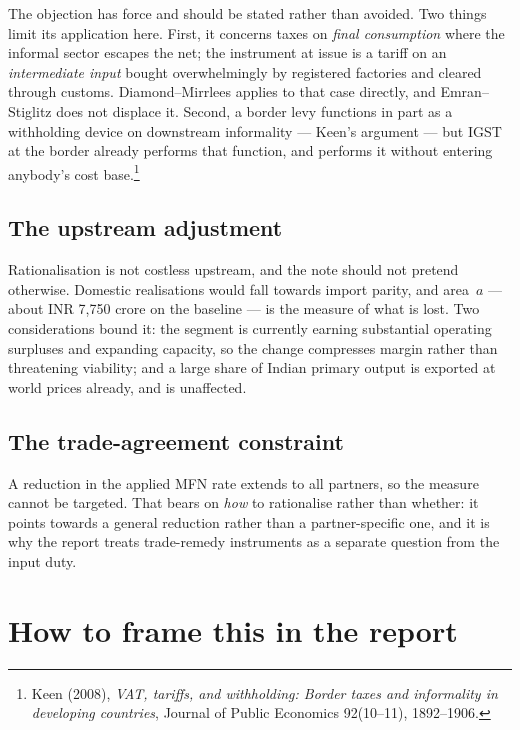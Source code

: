 \documentclass[11pt, a4paper]{article}
\begin{document}
The objection has force and should be stated rather than avoided. Two things limit
its application here. First, it concerns taxes on \emph{final consumption} where the
informal sector escapes the net; the instrument at issue is a tariff on an
\emph{intermediate input} bought overwhelmingly by registered factories and cleared
through customs. Diamond--Mirrlees applies to that case directly, and
Emran--Stiglitz does not displace it. Second, a border levy functions in part as a
withholding device on downstream informality --- Keen's argument --- but IGST at the
border already performs that function, and performs it without entering anybody's
cost base.\footnote{Keen (2008), \textit{VAT, tariffs, and withholding: Border taxes
and informality in developing countries}, Journal of Public Economics 92(10--11),
1892--1906.}

\subsection{The upstream adjustment}

Rationalisation is not costless upstream, and the note should not pretend otherwise.
Domestic realisations would fall towards import parity, and area~$a$ --- about
INR 7,750 crore on the baseline --- is the measure of what is lost. Two considerations
bound it: the segment is currently earning substantial operating surpluses and
expanding capacity, so the change compresses margin rather than threatening
viability; and a large share of Indian primary output is exported at world prices
already, and is unaffected.

\subsection{The trade-agreement constraint}

A reduction in the applied MFN rate extends to all partners, so the measure cannot be
targeted. That bears on \emph{how} to rationalise rather than whether: it points
towards a general reduction rather than a partner-specific one, and it is why the
report treats trade-remedy instruments as a separate question from the input duty.

\section{How to frame this in the report}
\end{document}
